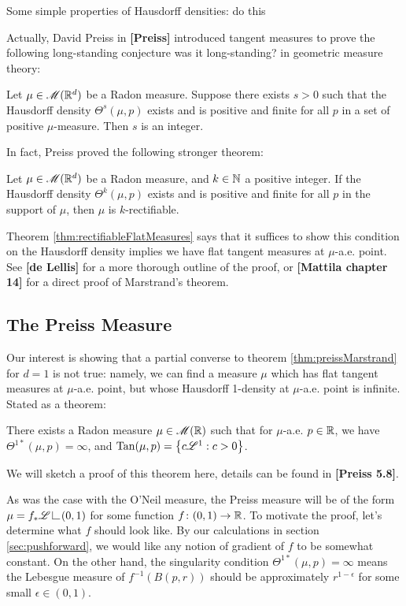 Some simple properties of Hausdorff densities: {\color{red} do this}


Actually, David Preiss in {\bf [Preiss]} introduced tangent measures to prove the following long-standing conjecture {\color{red} was it long-standing?} in geometric measure theory:
\begin{theorem}[Marstrand]
    Let $\mu \in \mathscr{M}(\mathbb{R}^d)$ be a Radon measure. Suppose there exists $s > 0$ such that the Hausdorff density $\Theta^s(\mu,p)$ exists and is positive and finite for all $p$ in a set of positive $\mu$-measure. Then $s$ is an integer.
\end{theorem}
In fact, Preiss proved the following stronger theorem:
\begin{theorem}[Preiss] \label{thm:preissMarstrand}
    Let $\mu \in \mathscr{M}(\mathbb{R}^d)$ be a Radon measure, and $k \in \mathbb{N}$ a positive integer. If the Hausdorff density $\Theta^k(\mu,p)$ exists and is positive and finite for all $p$ in the support of $\mu$, then $\mu$ is $k$-rectifiable.
\end{theorem}
Theorem \ref{thm:rectifiableFlatMeasures} says that it suffices to show this condition on the Hausdorff density implies we have flat tangent measures at $\mu$-a.e. point. See {\bf [de Lellis]} for a more thorough outline of the proof, or {\bf [Mattila chapter 14]} for  a direct proof of Marstrand's theorem.


\subsection{The Preiss Measure}
Our interest is showing that a partial converse to theorem \ref{thm:preissMarstrand} for $d=1$ is not true: namely, we can find a measure $\mu$ which has flat tangent measures at $\mu$-a.e. point, but whose Hausdorff 1-density at $\mu$-a.e. point is infinite. Stated as a theorem:
\begin{theorem}[Preiss]
    There exists a Radon measure $\mu \in \mathscr{M}(\mathbb{R})$ such that for $\mu$-a.e. $p \in \mathbb{R}$, we have $\Theta^{1*}(\mu,p) = \infty$, and $\operatorname{Tan}(\mu,p) = \left\{ {c \mathscr{L}^1 : c > 0} \right\}$.
\end{theorem}
We will sketch a proof of this theorem here, details can be found in {\bf [Preiss 5.8]}.

As was the case with the O'Neil measure, the Preiss measure will be of the form $\mu = f_* \scrL \restrict (0,1)$ for some function $f \colon (0,1) \to \mathbb{R}$. To motivate the proof, let's determine what $f$ should look like. By our calculations in section \ref{sec:pushforward}, we would like any notion of gradient of $f$ to be somewhat constant. On the other hand, the singularity condition $\Theta^{1*}(\mu,p) = \infty$ means the Lebesgue measure of $f^{-1}(B(p,r))$ should be approximately $r^{1-\epsilon}$ for some small $\epsilon \in (0,1)$.

